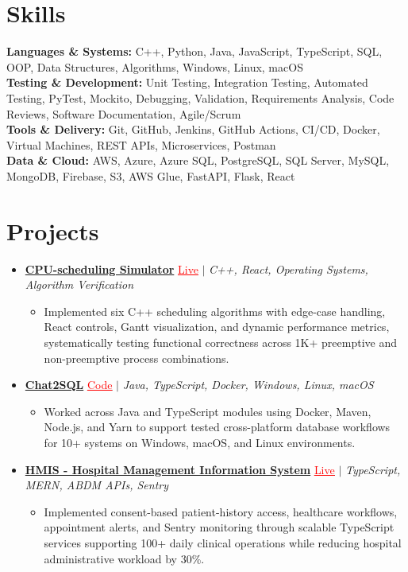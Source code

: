 \documentclass[letterpaper,10pt]{article}
\newcommand{\itemTail}{\vspace{-4pt}}
\newcommand{\sectionGap}{\vspace{-8pt}}
\newcommand{\projGap}{\vspace{3pt}}
\newcommand{\resumeItem}[1]{\item\small{{#1 \itemTail}}}
\newcommand{\resumeProjectHeading}[1]{\item \small #1 \vspace{-2pt}}
\newcommand{\resumeProjectLink}[2]{\href{#1}{\textcolor{red}{\underline{#2}}}}
\newcommand{\resumeSubHeadingListStart}{\begin{itemize}[leftmargin=0.0in, label={}]}
\newcommand{\resumeSubHeadingListEnd}{\end{itemize}}
\newcommand{\resumeProjItemListStart}{\begin{itemize}[leftmargin=0.15in,label=\textbullet,itemsep=3pt,topsep=0pt,parsep=0pt,partopsep=0pt]}
\newcommand{\resumeProjItemListEnd}{\end{itemize}\vspace{-4pt}}
\begin{document}
\section{Skills}
\begin{itemize}[leftmargin=0.15in, label={}]
\small{\item{
\textbf{Languages \& Systems:} C++, Python, Java, JavaScript, TypeScript, SQL, OOP, Data Structures, Algorithms, Windows, Linux, macOS \\
\textbf{Testing \& Development:} Unit Testing, Integration Testing, Automated Testing, PyTest, Mockito, Debugging, Validation, Requirements Analysis, Code Reviews, Software Documentation, Agile/Scrum \\
\textbf{Tools \& Delivery:} Git, GitHub, Jenkins, GitHub Actions, CI/CD, Docker, Virtual Machines, REST APIs, Microservices, Postman \\
\textbf{Data \& Cloud:} AWS, Azure, Azure SQL, PostgreSQL, SQL Server, MySQL, MongoDB, Firebase, S3, AWS Glue, FastAPI, Flask, React
}}
\end{itemize}
\sectionGap
\section{Projects}
\resumeSubHeadingListStart
\vspace{-2pt}
\resumeProjectHeading{\href{https://cpu-scheduler-amber.vercel.app/}{\textbf{CPU-scheduling Simulator}} \resumeProjectLink{https://cpu-scheduler-amber.vercel.app/}{Live} $|$ \emph{C++, React, Operating Systems, Algorithm Verification}}
\resumeProjItemListStart
\resumeItem{Implemented six C++ scheduling algorithms with edge-case handling, React controls, Gantt visualization, and dynamic performance metrics, systematically testing functional correctness across 1K+ preemptive and non-preemptive process combinations.}
\resumeProjItemListEnd
\projGap
\resumeProjectHeading{\href{https://github.com/SAHAJ-BHADJA/Chat2SQL}{\textbf{Chat2SQL}} \resumeProjectLink{https://github.com/SAHAJ-BHADJA/Chat2SQL}{Code} $|$ \emph{Java, TypeScript, Docker, Windows, Linux, macOS}}
\resumeProjItemListStart
\resumeItem{Worked across Java and TypeScript modules using Docker, Maven, Node.js, and Yarn to support tested cross-platform database workflows for 10+ systems on Windows, macOS, and Linux environments.}
\resumeProjItemListEnd
\projGap
\resumeProjectHeading{\href{https://hims-rouge.vercel.app/}{\textbf{HMIS - Hospital Management Information System}} \resumeProjectLink{https://hims-rouge.vercel.app/}{Live} $|$ \emph{TypeScript, MERN, ABDM APIs, Sentry}}
\resumeProjItemListStart
\resumeItem{Implemented consent-based patient-history access, healthcare workflows, appointment alerts, and Sentry monitoring through scalable TypeScript services supporting 100+ daily clinical operations while reducing hospital administrative workload by 30\%.}
\resumeProjItemListEnd
\resumeSubHeadingListEnd
\end{document}

